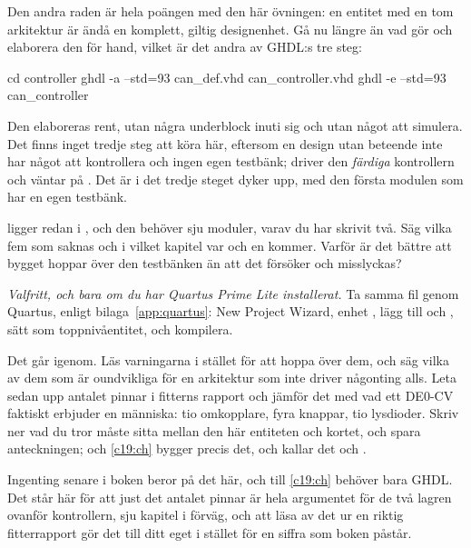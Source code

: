 Den andra raden är hela poängen med den här övningen: en entitet med en tom arkitektur är ändå en
komplett, giltig designenhet. Gå nu längre än vad  gör och elaborera den för
hand, vilket är det andra av GHDL:s tre steg:

\begin{shell}
cd controller
ghdl -a --std=93 can_def.vhd can_controller.vhd
ghdl -e --std=93 can_controller
\end{shell}

Den elaboreras rent, utan några underblock inuti sig och utan något att simulera. Det finns inget
tredje steg att köra här, eftersom en design utan beteende inte har något att kontrollera och ingen
egen testbänk;  driver den \emph{färdiga} kontrollern och väntar på
. Det är i  det tredje steget dyker upp, med den första modulen som
har en egen testbänk.

  ligger redan i , och den behöver sju moduler,
varav du har skrivit två. Säg vilka fem som saknas och i vilket kapitel var och en kommer. Varför är
det bättre att bygget hoppar över den testbänken än att det försöker och misslyckas?

 \emph{Valfritt, och bara om du har Quartus Prime Lite installerat.} Ta samma fil genom
Quartus, enligt bilaga~\ref{app:quartus}: New Project Wizard, enhet , lägg till
 och , sätt  som toppnivåentitet, och
kompilera.

Det går igenom. Läs varningarna i stället för att hoppa över dem, och säg vilka av dem som är
oundvikliga för en arkitektur som inte driver någonting alls. Leta sedan upp antalet pinnar i
fitterns rapport och jämför det med vad ett DE0-CV faktiskt erbjuder en människa: tio omkopplare,
fyra knappar, tio lysdioder. Skriv ner vad du tror måste sitta mellan den här entiteten och kortet,
och spara anteckningen;  och \ref{c19:ch} bygger precis det, och kallar det
 och .

Ingenting senare i boken beror på det här, och  till \ref{c19:ch} behöver bara GHDL.
Det står här för att just det antalet pinnar är hela argumentet för de två lagren ovanför
kontrollern, sju kapitel i förväg, och att läsa av det ur en riktig fitterrapport gör det till ditt
eget i stället för en siffra som boken påstår.

